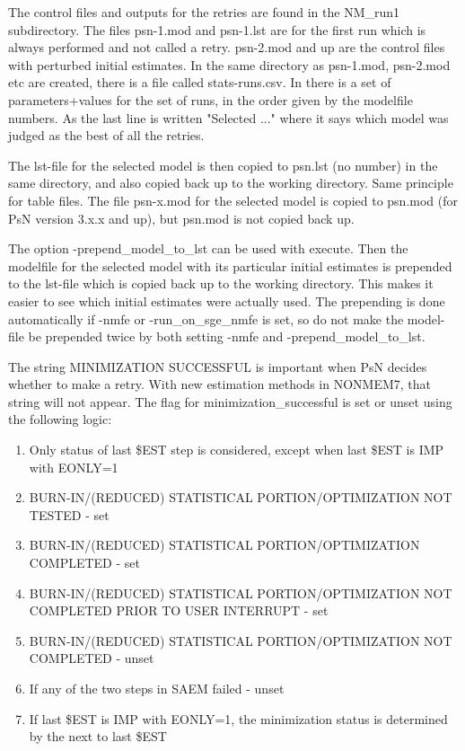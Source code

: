 The control files and outputs for the retries are found in the NM\_run1 subdirectory. The files psn-1.mod and psn-1.lst are for the first run which is always performed and not called a retry. psn-2.mod and up are the control files with perturbed initial estimates. In the same directory as psn-1.mod, psn-2.mod etc are created, there is a file called stats-runs.csv. In there is a set of parameters+values for the set of runs, in the order given by the modelfile numbers. As the last line is written "Selected ..." where it says which model was judged as the best of all the retries.

The lst-file for the selected model is then copied to psn.lst (no number) in the same directory, and also copied back up to the working directory. Same principle for table files. The file psn-x.mod for the selected model is copied to psn.mod (for PsN version 3.x.x and up), but psn.mod is not copied back up.   	

The option -prepend\_model\_to\_lst can be used with execute. Then the modelfile for the selected model with its particular initial estimates is prepended to the lst-file which is copied back up to the working directory. This makes it easier to see which initial estimates were actually used. The prepending is done automatically if -nmfe or -run\_on\_sge\_nmfe is set, so do not make the model-file be prepended twice by both setting -nmfe and -prepend\_model\_to\_lst.

The string MINIMIZATION SUCCESSFUL is important when PsN decides whether to make a retry. With new estimation methods in NONMEM7, that string will not appear. The flag for minimization\_successful is set or unset using the following logic:

\begin{enumerate}
\item Only status of last \$EST step is considered, except when last \$EST is IMP with EONLY=1
\item BURN-IN/(REDUCED) STATISTICAL PORTION/OPTIMIZATION NOT TESTED - set
\item BURN-IN/(REDUCED) STATISTICAL PORTION/OPTIMIZATION COMPLETED -  set
\item BURN-IN/(REDUCED) STATISTICAL PORTION/OPTIMIZATION NOT COMPLETED PRIOR TO USER INTERRUPT - set
\item BURN-IN/(REDUCED) STATISTICAL PORTION/OPTIMIZATION NOT COMPLETED - unset
\item If any of the two steps in SAEM failed - unset 
\item If last \$EST is IMP with EONLY=1, the minimization status is determined by the next to last \$EST
\end{enumerate}

